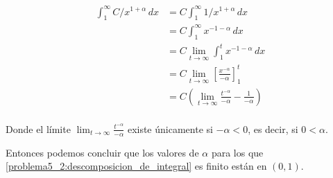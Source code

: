 \begin{align}
    \int_1^\infty C/x^{1+\alpha} \,dx   &=  C \int_1^\infty 1/x^{1+\alpha} \,dx                                                                     \\
                                        &=  C \int_1^\infty x^{-1-\alpha} \,dx                                                                      \\
                                        &=  C \lim_{t \rightarrow \infty} \int_1^t x^{-1-\alpha} \,dx                                               \\
                                        &=  C \lim_{t \rightarrow \infty} \left[ \frac{x^{-\alpha}}{-\alpha} \right]_1^t                            \\
                                        &=  C \left( \lim_{t \rightarrow \infty} \frac{t^{-\alpha}}{-\alpha} - \frac{1}{-\alpha} \right)            \\
\end{align}

Donde el límite $\lim_{t \rightarrow \infty} \frac{t^{-\alpha}}{-\alpha}$ existe únicamente si $-\alpha < 0$, es decir, si $0 < \alpha$.\pn

Entonces podemos concluir que los valores de $\alpha$ para los que \eqref{problema5_2:descomposicion_de_integral} es finito están en $(0, 1)$. 